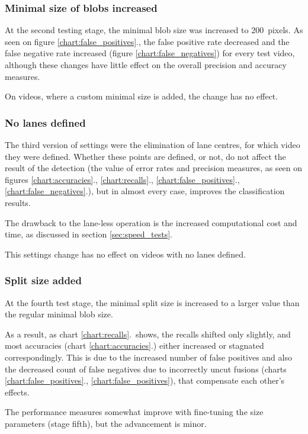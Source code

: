 \subsubsection{Minimal size of blobs increased}\label{sec:ver_2}
At the second testing stage, the minimal blob size was increased to \SI{200}{pixels}.
As seen on figure \ref{chart:false_positives}., the false positive rate decreased and the false negative rate increased (figure \ref{chart:false_negatives}) for every test video, although these changes have little effect on the overall precision and accuracy measures.

On videos, where a custom minimal size is added, the change has no effect.

\subsubsection{No lanes defined}\label{sec:ver_3}
The third version of settings were the elimination of lane centres, for which video they were defined.
Whether these points are defined, or not, do not affect the result of the detection (the value of error rates and precision measures, as seen on figures \ref{chart:accuracies}., \ref{chart:recalls}., \ref{chart:false_positives}., \ref{chart:false_negatives}.), but in almost every case, improves the classification results.

The drawback to the lane-less operation is the increased computational cost and time, as discussed in section \ref{sec:speed_tests}.

This settings change has no effect on videos with no lanes defined.

\subsubsection{Split size added}\label{sec:ver_4}
At the fourth test stage, the minimal split size is increased to a larger value than the regular minimal blob size.

As a result, as chart \ref{chart:recalls}.~shows, the recalls shifted only slightly, and most accuracies (chart \ref{chart:accuracies}.) either increased or stagnated correspondingly.
This is due to the increased number of false positives and also the decreased count of false negatives due to incorrectly uncut fusions (charts \ref{chart:false_positives}., \ref{chart:false_positives}), that compensate each other's effects.

The performance measures somewhat improve with fine-tuning the size parameters (stage fifth), but the advancement is minor.

